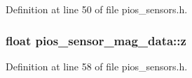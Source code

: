 \-Definition at line 50 of file pios\-\_\-sensors.\-h.

\hypertarget{group___p_i_o_s___s_e_n_s_o_r_s_ga77b8adea9b5e8b43c3ce7d4c60784862}{
\subsubsection[{z}]{\setlength{\rightskip}{0pt plus 5cm}float {\bf pios\-\_\-sensor\-\_\-mag\-\_\-data\-::z}}}\label{group___p_i_o_s___s_e_n_s_o_r_s_ga77b8adea9b5e8b43c3ce7d4c60784862}


\-Definition at line 58 of file pios\-\_\-sensors.\-h.

